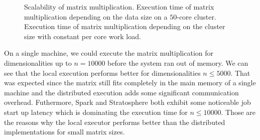 \begin{figure}
	\centering
	\begin{subfigure}{\dualpgfwidth}
		\caption{}
		\label{fig:mmLoadRuntime}
	\end{subfigure}
	\begin{subfigure}{\dualpgfwidth}
		\caption{}
		\label{fig:mmNodesRuntime}
	\end{subfigure}
	\caption{Scalability of matrix multiplication.  Execution time of matrix multiplication depending on the data size on a $50$-core cluster.  Execution time of matrix multiplication depending on the cluster size with constant per core work load.}
	\label{fig:mmBenchmark}
\end{figure}

On a single machine, we could execute the matrix multiplication for dimensionalities up to $n=10000$ before the system ran out of memory.
We can see that the local execution performs better for dimensionalities $n \le 5000$.
That was expected since the matrix still fits completely in the main memory of a single machine and the distributed execution adds some significant communication overhead.
Futhermore, Spark and Stratosphere both exhibit some noticeable job start up latency which is dominating the execution time for $n\le 10000$.
Those are the reasons why the local executor performs better than the distributed implementations for small matrix sizes.

